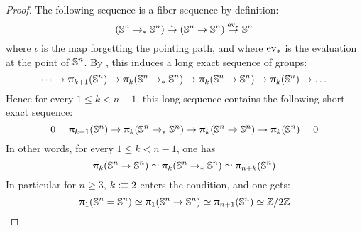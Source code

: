 \documentclass[english,a4]{article}
\newcommand{\ptdto}{\to_\ast}%
\begin{document}
\begin{proof}%
  The following sequence is a fiber sequence by definition:
  \begin{displaymath}
    (\Sn n \ptdto \Sn n) \stackrel \iota \to (\Sn n \to \Sn n) \stackrel {\ev_\ast}\to \Sn n
  \end{displaymath}
  where $\iota$ is the map forgetting the pointing path, and where $\mathrm{ev}_\ast$
  is the evaluation at the point of ${\mathbb S^{n}}$. By \cite[find lemma]{HoTT}, this
  induces a long exact sequence of groups:
  \begin{displaymath}
    \dots \to \hgr{k+1} (\Sn n) 
    \to \hgr k(\Sn n \ptdto \Sn n) \to \hgr k(\Sn n \to \Sn n) \to \hgr k(\Sn n) 
    \to \dots
  \end{displaymath}
  Hence for every $1\leq k < n-1$, this long sequence contains the following short exact sequence:
  \begin{displaymath}
    0 = \hgr {k+1}(\Sn n) 
    \to \hgr k(\Sn n \ptdto \Sn n) \to \hgr k(\Sn n \to \Sn n) 
    \to \hgr k(\Sn n) = 0
  \end{displaymath}
  In other words, for every $1\leq k < n-1$, one has 
  \begin{displaymath}
    \hgr k(\Sn n\to \Sn n) \weq \hgr k(\Sn n\ptdto\Sn n) \weq \hgr {n+k}(\Sn n)
  \end{displaymath}
  In particular for $n\geq 3$, $k\mathrel{\hbox{:}\mkern-5mu\equiv} 2$ enters the condition, and one gets:
  \begin{displaymath}
    \uppi_{1} ({\mathbb S^{n}} = {\mathbb S^{n}}) \simeq \uppi_{1} ({\mathbb S^{n}} \to {\mathbb S^{n}}) \simeq \uppi_{n+1} ({\mathbb S^{n}}) \simeq \mathbb{Z} \slash 2\mathbb{Z}
  \end{displaymath}
\end{proof}
\end{document}
